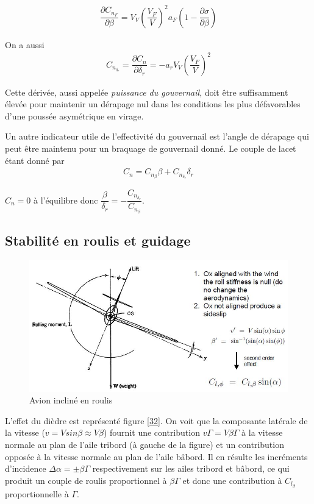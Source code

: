 \documentclass{report}
\begin{document}
\begin{eqnarray}
\dfrac{\partial C_{n_F}}{\partial \beta}=V_V\left(\dfrac{V_F}{V}\right)^2a_F\left(1-\dfrac{\partial\sigma}{\partial\beta}\right)
\end{eqnarray}

On a aussi
\begin{eqnarray}
C_{n_{\delta_r}}=\dfrac{\partial C_n}{\partial \delta_r} = -a_r V_V\left(\dfrac{V_F}{V}\right)^2
\end{eqnarray}

Cette dérivée, aussi appelée \textit{puissance du gouvernail}, doit être suffisamment élevée pour maintenir un dérapage nul dans les conditions les plus défavorables d'une poussée asymétrique en virage.

Un autre indicateur utile de l’effectivité du gouvernail est l’angle de dérapage qui peut être maintenu pour un braquage de gouvernail donné. Le couple de lacet étant donné par
\begin{eqnarray}
C_n=C_{n_\beta}\beta+C_{n_{\delta_r}}\delta_r
\end{eqnarray}

$C_n=0$ à l'équilibre donc $\dfrac{\beta}{\delta_r}=-\dfrac{C_{n_{\delta_r}}}{C_{n_{\beta}}}$.

\subsection{Stabilité en roulis et guidage}

\begin{figure}[h!]
    \centering
    \includegraphics[scale=0.7]{31.JPG}
    \caption{Avion incliné en roulis}
    \label{31}
\end{figure}

L'effet du dièdre est représenté figure \ref{32}. On voit que la composante latérale de la vitesse ($v=Vsin\beta\approx V\beta$) fournit une contribution $v\Gamma = V\beta \Gamma$ à la vitesse normale au plan de l'aile tribord (à gauche de la figure) et un contribution opposée à la vitesse normale au plan de l'aile bâbord. Il en résulte les incréments d'incidence $\Delta\alpha=\pm \beta\Gamma$ respectivement sur les ailes tribord et bâbord, ce qui produit un couple de roulis proportionnel à $\beta\Gamma$ et donc une contribution à $C_{l_\beta}$ proportionnelle à $\Gamma$.
\end{document}
